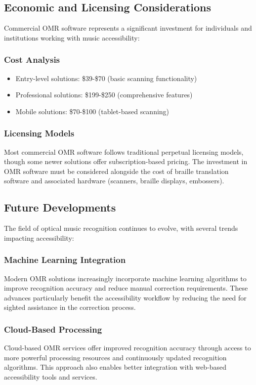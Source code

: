 \subsection{Economic and Licensing Considerations}

Commercial OMR software represents a significant investment for individuals and institutions working with music accessibility:

\subsubsection{Cost Analysis}
\begin{itemize}
    \item Entry-level solutions: \$39-\$70 (basic scanning functionality)
    \item Professional solutions: \$199-\$250 (comprehensive features)
    \item Mobile solutions: \$70-\$100 (tablet-based scanning)
\end{itemize}

\subsubsection{Licensing Models}
Most commercial OMR software follows traditional perpetual licensing models, though some newer solutions offer subscription-based pricing. The investment in OMR software must be considered alongside the cost of braille translation software and associated hardware (scanners, braille displays, embossers).

\subsection{Future Developments}

The field of optical music recognition continues to evolve, with several trends impacting accessibility:

\subsubsection{Machine Learning Integration}
Modern OMR solutions increasingly incorporate machine learning algorithms to improve recognition accuracy and reduce manual correction requirements. These advances particularly benefit the accessibility workflow by reducing the need for sighted assistance in the correction process.

\subsubsection{Cloud-Based Processing}
Cloud-based OMR services offer improved recognition accuracy through access to more powerful processing resources and continuously updated recognition algorithms. This approach also enables better integration with web-based accessibility tools and services.

